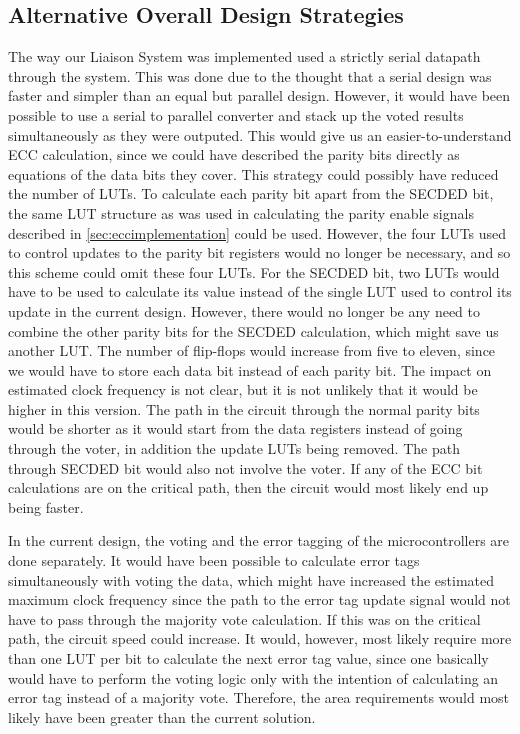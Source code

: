 \subsection{Alternative Overall Design Strategies}
\label{sec:alternativeoveralldesign}
The way our Liaison System was implemented used a strictly serial
datapath through the system. This was done due to the thought that a
serial design was faster and simpler than an equal but parallel
design. However, it would have been possible to use a serial to
parallel converter and stack up the voted results simultaneously as
they were outputed. This would give us an easier-to-understand ECC
calculation, since we could have described the parity bits directly as
equations of the data bits they cover. This strategy could possibly
have reduced the number of LUTs. To calculate each parity bit apart
from the SECDED bit, the same LUT structure as was used in calculating
the parity enable signals described in \autoref{sec:eccimplementation}
could be used. However, the four LUTs used to control updates to the
parity bit registers would no longer be necessary, and so this scheme
could omit these four LUTs. For the SECDED bit, two LUTs would have to
be used to calculate its value instead of the single LUT used to
control its update in the current design. However, there would no
longer be any need to combine the other parity bits for the SECDED
calculation, which might save us another LUT. The number of flip-flops
would increase from five to eleven, since we would have to store each
data bit instead of each parity bit. The impact on estimated clock
frequency is not clear, but it is not unlikely that it would be higher
in this version. The path in the circuit through the normal parity
bits would be shorter as it would start from the data registers
instead of going through the voter, in addition the update LUTs being
removed. The path through SECDED bit would also not involve the
voter. If any of the ECC bit calculations are on the critical path,
then the circuit would most likely end up being faster.

In the current design, the voting and the error tagging of the
microcontrollers are done separately. It would have been possible to
calculate error tags simultaneously with voting the data, which might
have increased the estimated maximum clock frequency since the path to
the error tag update signal would not have to pass through the
majority vote calculation. If this was on the critical path, the
circuit speed could increase. It would, however, most likely require
more than one LUT per bit to calculate the next error tag value, since
one basically would have to perform the voting logic only with the
intention of calculating an error tag instead of a majority
vote. Therefore, the area requirements would most likely have been
greater than the current solution.


